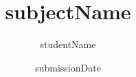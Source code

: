 \documentclass[a4paper,12pt,numbers=noenddot]{scrreprt} %
\title{subjectName}
\author{studentName}
\date{submissionDate}
\begin{document}

\begin{titlepage}
\clearpage
\vspace*{\fill}
\begin{center}
\begin{minipage}{.6\textwidth}
\maketitle
\end{minipage}
\end{center}
\vfill %
\clearpage
\end{titlepage}




\setcounter{tocdepth}{1}
\tableofcontents
\end{document}
